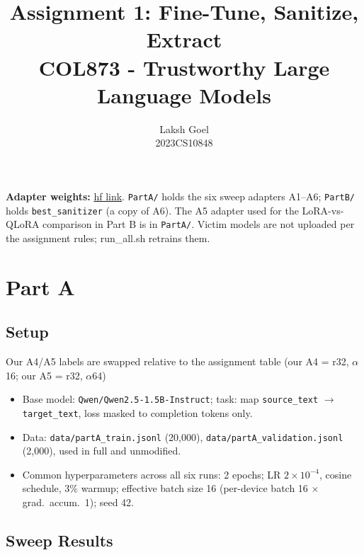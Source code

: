 \documentclass[10pt]{article}
\title{\vspace{-1.5em}Assignment 1: Fine-Tune, Sanitize, Extract\\
\large COL873 - Trustworthy Large Language Models}
\author{Laksh Goel \\ 2023CS10848}
\date{}
\begin{document}
\maketitle
\vspace{-2em}

\noindent\textbf{Adapter weights:} \href{https://huggingface.co/lakshgoel/col873-A1-adapters}{hf link}.
\texttt{PartA/} holds the six sweep adapters A1--A6; \texttt{PartB/} holds \texttt{best\_sanitizer} (a copy of A6). The A5 adapter used for the LoRA-vs-QLoRA comparison in Part B is in \texttt{PartA/}. Victim models are not uploaded per the assignment rules; run\_all.sh retrains them.

\section{Part A}

\subsection{Setup}
Our A4/A5 labels are swapped relative to the assignment table (our A4 = r32, $\alpha$ 16; our A5 = r32, $\alpha$64)
\begin{itemize}
  \item Base model: \texttt{Qwen/Qwen2.5-1.5B-Instruct}; task: map \texttt{source\_text} $\to$ \texttt{target\_text}, loss masked to completion tokens only.
  \item Data: \texttt{data/partA\_train.jsonl} (20{,}000), \texttt{data/partA\_validation.jsonl} (2{,}000), used in full and unmodified.
  \item Common hyperparameters across all six runs: 2 epochs; LR $2\times10^{-4}$, cosine schedule, 3\% warmup; effective batch size 16 (per-device batch 16 $\times$ grad.\ accum.\ 1); seed 42.
\end{itemize}

\subsection{Sweep Results}
\end{document}
